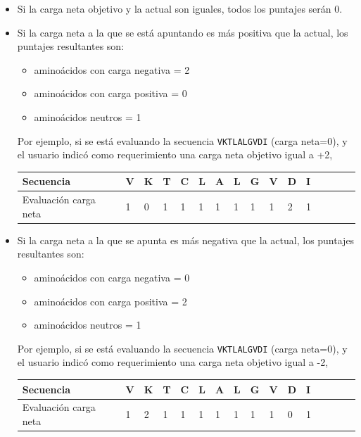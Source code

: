 \begin{itemize}
  \item Si la carga neta objetivo y la actual son iguales, todos los puntajes serán 0.
 
\item Si la carga neta a la que se está apuntando es más positiva que la actual, los puntajes resultantes son: 
  \begin{itemize}
   \item  aminoácidos con carga negativa = 2
  \item aminoácidos con carga positiva = 0
  \item aminoácidos neutros = 1
  \end{itemize}
Por ejemplo, si se está evaluando la secuencia \texttt{VKTLALGVDI} (carga neta=0), y el usuario indicó como requerimiento una carga neta objetivo igual a +2, 
   
 
 \vspace{0.5cm}
\begin{center}
  \begin{tabular}{llllllllllllllll} 
\hline

Secuencia & \textbf{V} & \textbf{K} & \textbf{T} & \textbf{C} & \textbf{L} & \textbf{A} & \textbf{L} & \textbf{G} & \textbf{V} & \textbf{D} & \textbf{I} \\ \hline
Evaluación carga neta & 1 & 0 & 1 & 1 & 1 & 1 & 1 & 1 & 1 & 2 & 1  \\ \hline
\end{tabular}
\end{center}

 
 \item Si la carga neta a la que se apunta es más negativa que la actual, los puntajes resultantes son:
  \begin{itemize}
   \item  aminoácidos con carga negativa = 0
  \item aminoácidos con carga positiva = 2
  \item aminoácidos neutros = 1
  \end{itemize}

   Por ejemplo, si se está evaluando la secuencia \texttt{VKTLALGVDI} (carga neta=0), y el usuario indicó como requerimiento una carga neta objetivo igual a -2, 
   
   \vspace{0.5cm}

   \begin{center}
\begin{tabular}{llllllllllllllll} 
\hline
Secuencia & \textbf{V} & \textbf{K} & \textbf{T} & \textbf{C} & \textbf{L} & \textbf{A} & \textbf{L} & \textbf{G} & \textbf{V} & \textbf{D} & \textbf{I}\\ \hline
Evaluación carga neta & 1 & 2 & 1 & 1 & 1 & 1 & 1 & 1 & 1 & 0 & 1  \\ \hline
\end{tabular}

   \end{center}
   
\end{itemize}





